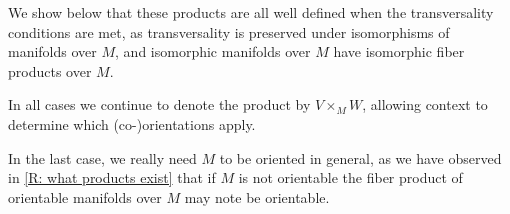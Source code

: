 \begin{definition}
	We show below that these products are all well defined when the transversality conditions are met, as transversality is preserved under isomorphisms of manifolds over $M$, and isomorphic manifolds over $M$ have isomorphic fiber products over $M$.

	In all cases we continue to denote the product by $V \times_M W$, allowing context to determine which (co\nobreakdash-)orientations apply.
\end{definition}



In the last case, we really need $M$ to be oriented in general, as we have observed in \cref{R: what products exist} that if $M$ is not orientable the fiber product of orientable manifolds over $M$ may note be orientable.

\begin{comment}
In the cases where $r_V$ and $r_W$ are transverse embeddings, these products are represented by just taking intersections, with the orientations or co-orientations given explicitly in \cref{P: normal pullback,P: cap of immersions,P: orient intersection}.
If $r_V$ and $r_W$ are immersions, these descriptions hold locally.
\end{comment}

